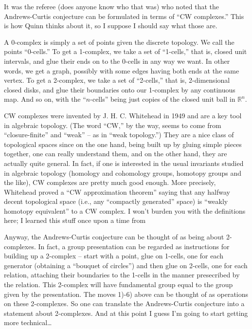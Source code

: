 \documentclass{article}
\def\tightlist{}
\renewcommand{\texttt}[1]{%
  \begingroup
  \ttfamily
  \begingroup\lccode`~=`/\lowercase{\endgroup\def~}{/\discretionary{}{}{}}%
  \begingroup\lccode`~=`[\lowercase{\endgroup\def~}{[\discretionary{}{}{}}%
  \begingroup\lccode`~=`.\lowercase{\endgroup\def~}{.\discretionary{}{}{}}%
  \catcode`/=\active\catcode`[=\active\catcode`.=\active
  \scantokens{#1\noexpand}%
  \endgroup
}
\begin{document}
It was the referee (does anyone know who that was) who noted that the
Andrews-Curtis conjecture can be formulated in terms of ``CW
complexes.'' This is how Quinn thinks about it, so I suppose I should
say what those are.

A 0-complex is simply a set of points given the discrete topology. We
call the points ``0-cells.'' To get a 1-complex, we take a set of
``1-cells,'' that is, closed unit intervals, and glue their ends on to
the 0-cells in any way we want. In other words, we get a graph, possibly
with some edges having both ends at the same vertex. To get a 2-complex,
we take a set of ``2-cells,'' that is, 2-dimensional closed disks, and
glue their boundaries onto our 1-complex by any continuous map. And so
on, with the ``\(n\)-cells'' being just copies of the closed unit ball
in \(\mathbb{R}^n\).

CW complexes were invented by J. H. C. Whitehead in 1949 and are a key
tool in algebraic topology. (The word ``CW,'' by the way, seems to come
from ``closure-finite'' and ``weak'' -- as in ``weak topology.'') They
are a nice class of topological spaces since on the one hand, being
built up by gluing simple pieces together, one can really understand
them, and on the other hand, they are actually quite general. In fact,
if one is interested in the usual invariants studied in algebraic
topology (homology and cohomology groups, homotopy groups and the like),
CW complexes are pretty much good enough. More precisely, Whitehead
proved a ``CW approximation theorem'' saying that any halfway decent
topological space (i.e., any ``compactly generated'' space) is ``weakly
homotopy equivalent'' to a CW complex. I won't burden you with the
definitions here; I learned this stuff once upon a time from


Anyway, the Andrews-Curtis conjecture can be thought of as being about
2-complexes. In fact, a group presentation can be regarded as
instructions for building up a 2-complex -- start with a point, glue on
1-cells, one for each generator (obtaining a ``bouquet of circles'') and
then glue on 2-cells, one for each relation, attaching their boundaries
to the 1-cells in the manner presecribed by the relation. This 2-complex
will have fundamental group equal to the group given by the
presentation. The moves 1)-6) above can be thought of as operations on
these 2-complexes. So one can translate the Andrews-Curtis conjecture
into a statement about 2-complexes. And at this point I guess I'm going
to start getting more technical\ldots{}
\end{document}
